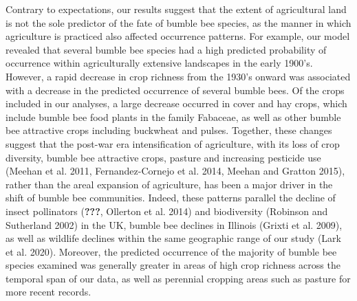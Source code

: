 \documentclass[11pt,]{article}
\begin{document}
Contrary to expectations, our results suggest that the extent of
agricultural land is not the sole predictor of the fate of bumble bee
species, as the manner in which agriculture is practiced also affected
occurrence patterns. For example, our model revealed that several bumble
bee species had a high predicted probability of occurrence within
agriculturally extensive landscapes in the early 1900's. However, a
rapid decrease in crop richness from the 1930's onward was associated
with a decrease in the predicted occurrence of several bumble bees. Of
the crops included in our analyses, a large decrease occurred in cover
and hay crops, which include bumble bee food plants in the family
Fabaceae, as well as other bumble bee attractive crops including
buckwheat and pulses. Together, these changes suggest that the post-war
era intensification of agriculture, with its loss of crop diversity,
bumble bee attractive crops, pasture and increasing pesticide use
(Meehan et al. 2011, Fernandez-Cornejo et al. 2014, Meehan and Gratton
2015), rather than the areal expansion of agriculture, has been a major
driver in the shift of bumble bee communities. Indeed, these patterns
parallel the decline of insect pollinators ({\textbf{???}}, Ollerton et
al. 2014) and biodiversity (Robinson and Sutherland 2002) in the UK,
bumble bee declines in Illinois (Grixti et al. 2009), as well as
wildlife declines within the same geographic range of our study (Lark et
al. 2020). Moreover, the predicted occurrence of the majority of bumble
bee species examined was generally greater in areas of high crop
richness across the temporal span of our data, as well as perennial
cropping areas such as pasture for more recent records.
\end{document}
